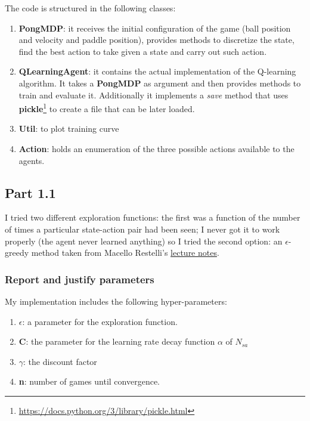 \documentclass[11pt]{article}
\begin{document}
The code is structured in the following classes:
\begin{enumerate}
\item \textbf{PongMDP}: it receives the initial configuration of the game (ball position and velocity and paddle position), provides methods to discretize the state, find the best action to take given a state and carry out such action.
\item \textbf{QLearningAgent}: it contains the actual implementation of the Q-learning algorithm. It takes a \textbf{PongMDP} as argument and then provides methods to train and evaluate it. Additionally it implements a \textit{save} method that uses \textbf{pickle}\footnote{\url{https://docs.python.org/3/library/pickle.html}} to create a file that can be later loaded.
\item \textbf{Util}: to plot training curve
\item \textbf{Action}: holds an enumeration of the three possible actions available to the agents.
\end{enumerate}

\subsection*{Part 1.1}
I tried two different exploration functions: the first was a function of the number of times a particular state-action pair had been seen; I never got it to work properly (the agent never learned anything) so I tried the second option: an $\epsilon$-greedy method taken from Macello Restelli's \href{http://home.deib.polimi.it/restelli/MyWebSite/pdf/rl5.pdf}{lecture notes}.\\

\subsubsection*{Report and justify parameters}

My implementation includes the following hyper-parameters:
\begin{enumerate}
\item $\epsilon$: a parameter for the exploration function.
\item \textbf{C}: the parameter for the learning rate decay function $\alpha$ of $N_{sa}$
\item $\gamma$: the discount factor
\item \textbf{n}: number of games until convergence.
\end{enumerate}
\end{document}
